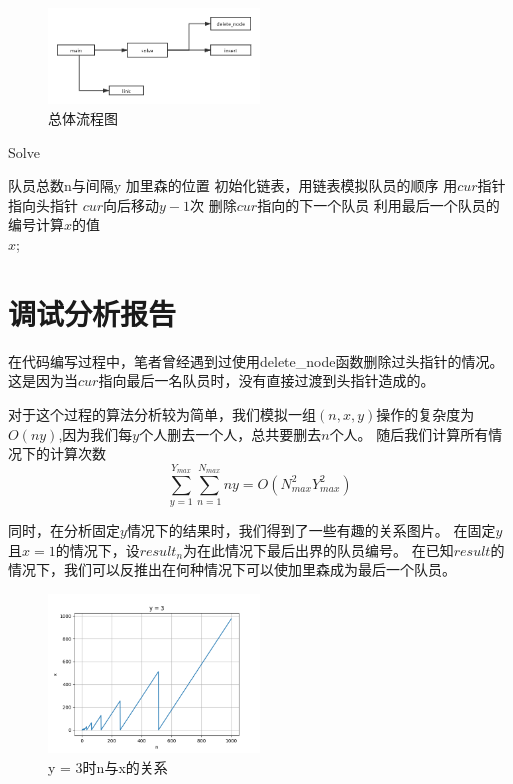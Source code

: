 \begin{figure}[H]
   \centering
   \includegraphics[width=0.5\textwidth]{images/process.png}
   \caption{总体流程图}
\end{figure}


\begin{algorithm}[htb] 
\caption{ Solve } 
\label{alg:Framwork} 
\begin{algorithmic}[1]
\Require
队员总数n与间隔y
\Ensure
加里森的位置
\State 初始化链表，用链表模拟队员的顺序
\State 用$cur$指针指向头指针
\State $cur$向后移动$y-1$次
\State 删除$cur$指向的下一个队员
\EndWhile
\State 利用最后一个队员的编号计算$x$的值 \\
\Return $x$; 
\end{algorithmic} 
\end{algorithm}


\section{调试分析报告}
   在代码编写过程中，笔者曾经遇到过使用delete\_node函数删除过头指针的情况。
   这是因为当$cur$指向最后一名队员时，没有直接过渡到头指针造成的。


   对于这个过程的算法分析较为简单，我们模拟一组$(n, x, y)$操作的复杂度为$O(ny)$,因为我们每$y$个人删去一个人，总共要删去$n$个人。
   随后我们计算所有情况下的计算次数$$ \sum^{Y_{max}}_{y = 1}{\sum^{N_{max}}_{n = 1}{ny}} = O(N_{max}^2Y_{max}^2)$$

   同时，在分析固定$y$情况下的结果时，我们得到了一些有趣的关系图片。
   在固定$y$且$x = 1$的情况下，设$result_n$为在此情况下最后出界的队员编号。
   在已知$result$的情况下，我们可以反推出在何种情况下可以使加里森成为最后一个队员。

   \begin{figure}[H]
      \centering
      \includegraphics[width=0.5\textwidth]{images/y3.png}
      \caption{y = 3时n与x的关系}
   \end{figure}


